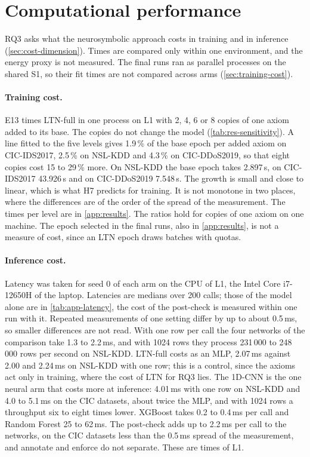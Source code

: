 \section{Computational performance}
\label{sec:res-cost}

RQ3 asks what the neurosymbolic approach costs in training and in inference (\cref{sec:cost-dimension}). Times are
compared only within one environment, and the energy proxy is not measured. The final runs ran as parallel processes
on the shared S1, so their fit times are not compared across arms (\cref{sec:training-cost}).

\paragraph{Training cost.}
E13 times LTN-full in one process on L1 with 2, 4, 6 or 8 copies of one axiom added to its base. The copies
do not change the model (\cref{tab:res-sensitivity}). A line fitted to the five levels gives 1.9\,\% of the base epoch per added axiom on CIC-IDS2017, 2.5\,\% on NSL-KDD and
4.3\,\% on CIC-DDoS2019, so that eight copies cost 15 to 29\,\% more. On NSL-KDD the base epoch takes 2.897\,s, on CIC-IDS2017 43.926\,s and on CIC-DDoS2019 7.548\,s. The
growth is small and close to linear, which is what H7 predicts for training. It is not monotone in two places, where
the differences are of the order of the spread of the measurement. The times per level are in \cref{app:results}.
The ratios hold for copies of one axiom on one machine. The epoch selected in the final runs, also in
\cref{app:results}, is not a measure of cost, since an LTN epoch draws batches with quotas.

\paragraph{Inference cost.}
Latency was taken for seed 0 of each arm on the CPU of L1, the Intel Core i7-12650H of the laptop. Latencies are medians over 200 calls; those of the
model alone are in \cref{tab:app-latency}, the cost of the post-check is measured within one run with it. Repeated
measurements of one setting differ by up to about 0.5\,ms, so smaller differences are not read. With one row per call
the four networks of the comparison take 1.3 to 2.2\,ms, and with 1024 rows they process 231\,000 to 248\,000 rows per
second on NSL-KDD. LTN-full costs as an MLP, 2.07\,ms against 2.00 and 2.24\,ms on NSL-KDD with one row; this is a
control, since the axioms act only in training, where the cost of LTN for RQ3 lies. The 1D-CNN is the one neural arm
that costs more at inference: 4.01\,ms with one row on NSL-KDD and 4.0 to 5.1\,ms on the CIC datasets, about twice the
MLP, and with 1024 rows a throughput six to eight times lower. XGBoost takes 0.2 to 0.4\,ms per call and Random Forest
25 to 62\,ms. The post-check adds up to 2.2\,ms per call to the networks, on the CIC datasets less than the 0.5\,ms
spread of the measurement, and annotate and enforce do not separate. These are times of L1.

